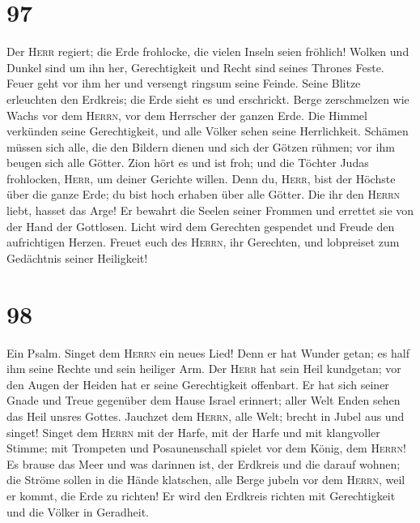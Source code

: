\hypertarget{section-96}{%
\section{97}\label{section-96}}

 Der \textsc{Herr} regiert; die Erde frohlocke, die vielen
Inseln seien fröhlich!  Wolken und Dunkel sind um ihn her,
Gerechtigkeit und Recht sind seines Thrones Feste.  Feuer
geht vor ihm her und versengt ringsum seine Feinde.  Seine
Blitze erleuchten den Erdkreis; die Erde sieht es und erschrickt.
 Berge zerschmelzen wie Wachs vor dem \textsc{Herrn}, vor
dem Herrscher der ganzen Erde.  Die Himmel verkünden seine
Gerechtigkeit, und alle Völker sehen seine Herrlichkeit. 
Schämen müssen sich alle, die den Bildern dienen und sich der Götzen
rühmen; vor ihm beugen sich alle Götter.  Zion hört es und
ist froh; und die Töchter Judas frohlocken, \textsc{Herr}, um deiner
Gerichte willen.  Denn du, \textsc{Herr}, bist der Höchste
über die ganze Erde; du bist hoch erhaben über alle Götter.
 Die ihr den \textsc{Herrn} liebt, hasset das Arge! Er
bewahrt die Seelen seiner Frommen und errettet sie von der Hand der
Gottlosen.  Licht wird dem Gerechten gespendet und Freude
den aufrichtigen Herzen.  Freuet euch des \textsc{Herrn},
ihr Gerechten, und lobpreiset zum Gedächtnis seiner Heiligkeit!

\hypertarget{section-97}{%
\section{98}\label{section-97}}

 Ein Psalm. Singet dem \textsc{Herrn} ein neues Lied! Denn
er hat Wunder getan; es half ihm seine Rechte und sein heiliger Arm.
 Der \textsc{Herr} hat sein Heil kundgetan; vor den Augen
der Heiden hat er seine Gerechtigkeit offenbart.  Er hat
sich seiner Gnade und Treue gegenüber dem Hause Israel erinnert; aller
Welt Enden sehen das Heil unsres Gottes.  Jauchzet dem
\textsc{Herrn}, alle Welt; brecht in Jubel aus und singet!
 Singet dem \textsc{Herrn} mit der Harfe, mit der Harfe
und mit klangvoller Stimme;  mit Trompeten und
Posaunenschall spielet vor dem König, dem \textsc{Herrn}! 
Es brause das Meer und was darinnen ist, der Erdkreis und die darauf
wohnen;  die Ströme sollen in die Hände klatschen, alle
Berge jubeln vor dem \textsc{Herrn}, weil er kommt, die Erde zu richten!
 Er wird den Erdkreis richten mit Gerechtigkeit und die
Völker in Geradheit.

